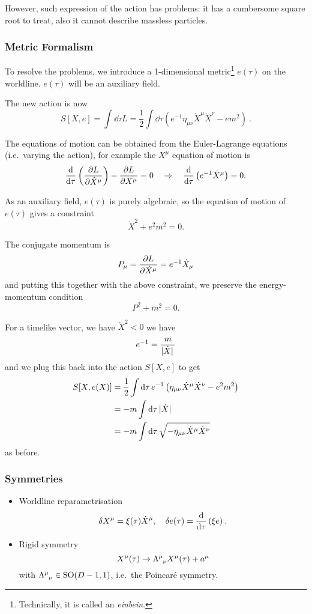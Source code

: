 \documentclass[a4paper,11pt]{article}
\begin{document}
	However, such expression of the action has problems: it has a cumbersome square root to treat, also it cannot describe massless particles.

	\subsubsection{Metric Formalism}

	To resolve the problems, we introduce a 1-dimensional metric\footnote{Technically, it is called an \emph{einbein}.} $e(\tau)$ on the worldline. $e(\tau)$ will be an auxiliary field. 

	The new action is now 
	\[
		\boxed{S[X,e] = \int \dd{\tau} L = \frac{1}{2} \int \dd{\tau} \left( e^{-1} \eta _{\mu \nu} \dot X^\mu \dot X^\nu - e m^2 \right)}\ .
	\]
	
	The equations of motion can be obtained from the Euler-Lagrange equations (i.e.\ varying the action), for example the $X^\mu$ equation of motion is 
	\[
		\dv{\tau}\left(  \pdv{L}{\dot X^\mu} \right) - \pdv{L}{X^\mu} = 0 \quad \Rightarrow \quad \dv{\tau} \left( e^{-1} \dot X^\mu \right) = 0.
	\]
	
	As an auxiliary field, $e(\tau)$ is purely algebraic, so the equation of motion of $e(\tau)$ gives a constraint
	\[
		\dot X^2 + e^2 m^2 = 0.
	\]

	The conjugate momentum is 
	\[
		P_\mu = \pdv{L}{\dot X^\mu} = e^{-1} \dot X_\mu
	\]
	and putting this together with the above constraint, we preserve the energy-momentum condition
	\[
		P^2 + m^2 = 0.
	\]
	
	For a timelike vector, we have $\dot X^2 < 0$ we have 
	\[
		e^{-1} = \frac{m}{\abs*{\dot X}}
	\]
	and we plug this back into the action $S[X,e]$ to get
	\begin{align*}
		S[X,e(X)] & = \frac{1}{2} \int \dd{\tau} e^{-1} \left( \eta _{\mu \nu} \dot X^\mu \dot X^\nu - e^2 m^2 \right)\\
		& = - m \int \dd{\tau} \abs*{\dot X}\\
		& = - m \int \dd{\tau} \sqrt{- \eta _{\mu \nu} \dot X^\mu \dot X^\nu}
	\end{align*}
	as before.

	\subsubsection{Symmetries}
	\begin{itemize}
		\item Worldline reparametrisation \[
			\delta X^\mu = \xi(\tau)\dot X^\mu, \quad \delta e (\tau) = \dv{\tau}\left( \xi e \right).
		\]
		\item Rigid symmetry \[
			X^\mu (\tau) \to \LT{\mu}{\nu} X^\mu(\tau) + a^\mu
		\]
		with $\LT{\mu}{\nu}\in \SO(D - 1,1)$, i.e.\ the Poincar\'e symmetry. 
	\end{itemize}
\end{document}
